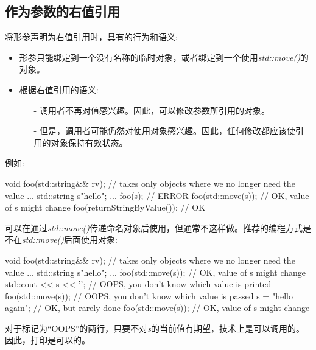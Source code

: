 \subsection{作为参数的右值引用}

将形参声明为右值引用时，具有的行为和语义:

\begin{itemize}
	\item 形参只能绑定到一个没有名称的临时对象，或者绑定到一个使用\textit{std::move()}的对象。
	\item 根据右值引用的语义:
	\begin{itemize}
		\item[-] 调用者不再对值感兴趣。因此，可以修改参数所引用的对象。
		\item[-] 但是，调用者可能仍然对使用对象感兴趣。因此，任何修改都应该使引用的对象保持有效状态。
	\end{itemize}	
\end{itemize}

例如:

\begin{cppcode}
void foo(std::string&& rv); // takes only objects where we no longer need the value
...
std::string s{"hello"};
...
foo(s); // ERROR
foo(std::move(s)); // OK, value of s might change
foo(returnStringByValue()); // OK
\end{cppcode}

可以在通过\textit{std::move()}传递命名对象后使用，但通常不这样做。推荐的编程方式是不在\textit{std::move()}后面使用对象:

\begin{cppcode}
void foo(std::string&& rv); // takes only objects where we no longer need the value
...
std::string s{"hello"};
...
foo(std::move(s)); // OK, value of s might change
std::cout << s << '\n'; // OOPS, you don’t know which value is printed
foo(std::move(s)); // OOPS, you don’t know which value is passed
s = "hello again"; // OK, but rarely done
foo(std::move(s)); // OK, value of s might change
\end{cppcode}

对于标记为“OOPS”的两行，只要不对\textit{s}的当前值有期望，技术上是可以调用的。因此，打印是可以的。




